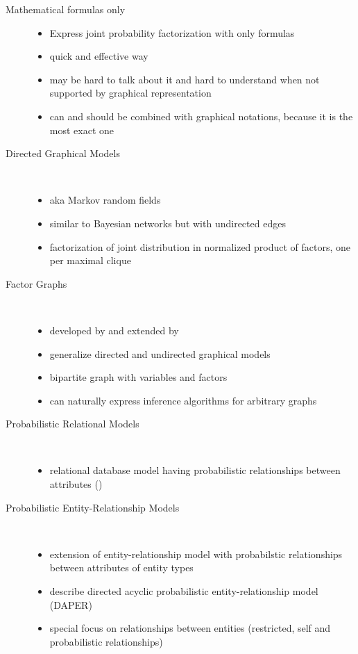 \begin{description}
\item[Mathematical formulas only]
\begin{itemize}
\item Express joint probability factorization with only formulas
\item quick and effective way
\item may be hard to talk about it and hard to understand when not supported by graphical representation
\item can and should be combined with graphical notations, because it is the most exact one
\end{itemize}

\item[Directed Graphical Models]\ 
\begin{itemize}
\item aka Markov random fields
\item similar to Bayesian networks but with undirected edges
\item factorization of joint distribution in normalized product of factors, one per maximal clique
\end{itemize}

\item[Factor Graphs]\ 
\begin{itemize}
\item developed by \textcite{kschischang2001factor} and extended by \textcite{frey2002extending}
\item generalize directed and undirected graphical models
\item bipartite graph with variables and factors
\item can naturally express inference algorithms for arbitrary graphs
\end{itemize}

\item[Probabilistic Relational Models]\ 
\begin{itemize}
\item relational database model having probabilistic relationships between attributes (\cite{friedman1999learning})
\end{itemize}

\item[Probabilistic Entity-Relationship Models]\ 
\begin{itemize}
\item extension of entity-relationship model with probabilstic relationships between attributes of entity types
\item \cite{heckerman2007probabilistic} describe directed acyclic probabilistic entity-relationship model (DAPER)
\item special focus on relationships between entities (restricted, self and probabilistic relationships)
\end{itemize}
\end{description}

